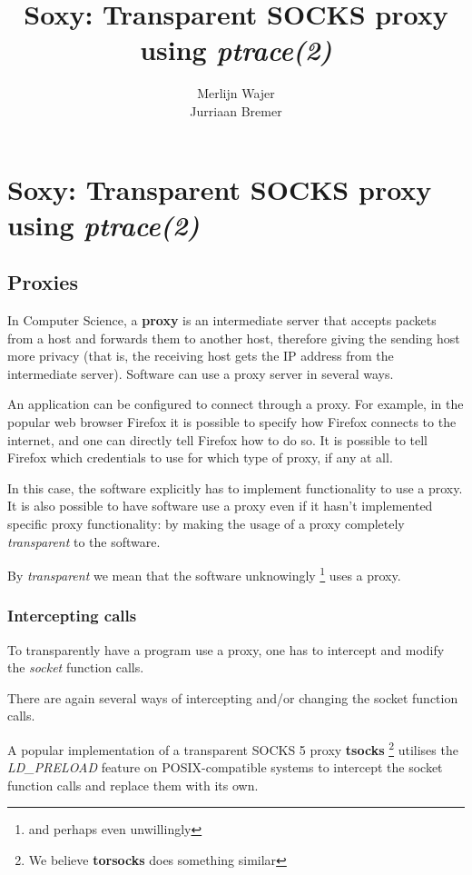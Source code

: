 \documentclass[a4paper]{article}
\author{Merlijn Wajer \\ Jurriaan Bremer}
\title{Soxy: Transparent SOCKS proxy using \textit{ptrace(2)}}
\begin{document}
\maketitle

\section{Soxy: Transparent SOCKS proxy using \textit{ptrace(2)}}

\subsection{Proxies}
In Computer Science, a \textbf{proxy} is an intermediate server that
accepts packets from a host and forwards them to another host,
therefore giving the sending host more privacy (that is, the
receiving host gets the IP address from the intermediate server).
Software can use a proxy server in several ways.

An application can be configured to connect through a proxy. For example, in the popular web
browser Firefox it is possible to specify how Firefox connects to the internet,
and one can directly tell Firefox how to do so. It is possible to tell Firefox which credentials to use for which type of proxy, if any at all.

In this case, the software explicitly has to implement functionality to use a
proxy. It is also possible to have software use a proxy even if it hasn't
implemented specific proxy functionality: by making the usage of a proxy
completely \textit{transparent} to the software.

By \textit{transparent} we mean that the software unknowingly
\footnote{and perhaps even unwillingly} uses a proxy.

\subsubsection{Intercepting calls}

To transparently have a program use a proxy, one has to intercept and modify
the \textit{socket} function calls.

There are again several ways of intercepting and/or changing the socket function
calls.

A popular implementation of a transparent SOCKS 5 proxy \textbf{tsocks}
\footnote{We believe \textbf{torsocks} does something similar}
utilises the \textit{LD\_PRELOAD} feature on POSIX-compatible systems to
intercept the socket function calls and replace them with its own.
\end{document}
